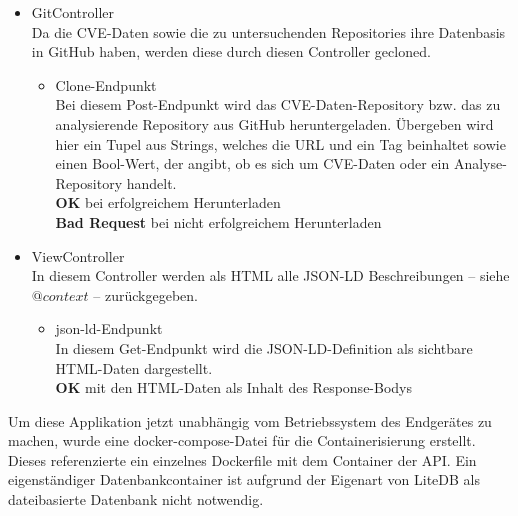 \begin{itemize}
        \item GitController \label{api_controller:one} \\
            Da die \ac{CVE}-Daten sowie die zu untersuchenden Repositories ihre Datenbasis in GitHub\cite{GITHUB} haben, werden diese durch diesen Controller gecloned.
            \begin{itemize}
                \item Clone-Endpunkt \\
                    Bei diesem Post-Endpunkt wird das CVE-Daten-Repository bzw. das zu analysierende Repository aus GitHub heruntergeladen.
                    Übergeben wird hier ein Tupel aus Strings, welches die URL und ein Tag beinhaltet sowie einen Bool-Wert, der angibt, ob es sich um CVE-Daten oder ein Analyse-Repository handelt.
                    \\
                    \textbf{OK} bei erfolgreichem Herunterladen
                    \\
                    \textbf{Bad Request} bei nicht erfolgreichem Herunterladen
            \end{itemize}

        \item ViewController \label{api_controller:four}\\
            In diesem Controller werden als HTML alle \ac{JSON-LD} Beschreibungen -- siehe $@context$ -- zurückgegeben.
            \begin{itemize}
                \item json-ld-Endpunkt \\
                    In diesem Get-Endpunkt wird die JSON-LD-Definition als sichtbare HTML-Daten dargestellt.
                    \\
                    \textbf{OK} mit den HTML-Daten als Inhalt des Response-Bodys
            \end{itemize}
    \end{itemize}

    Um diese Applikation jetzt unabhängig vom Betriebssystem des Endgerätes zu machen, wurde eine docker-compose-Datei für die Containerisierung erstellt.
    Dieses referenzierte ein einzelnes Dockerfile mit dem Container der API.
    Ein eigenständiger Datenbankcontainer ist aufgrund der Eigenart von LiteDB als dateibasierte Datenbank nicht notwendig.

